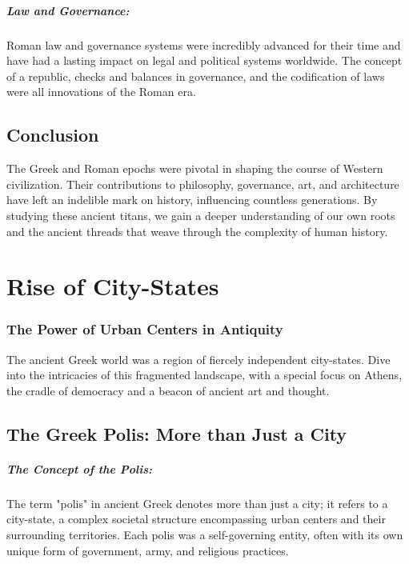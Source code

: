 \documentclass[a4paper,12pt]{book}
\begin{document}
\paragraph{Law and Governance:}
Roman law and governance systems were incredibly advanced for their time and have had a lasting impact on legal and political systems worldwide. The concept of a republic, checks and balances in governance, and the codification of laws were all innovations of the Roman era.

\section*{Conclusion}

The Greek and Roman epochs were pivotal in shaping the course of Western civilization. Their contributions to philosophy, governance, art, and architecture have left an indelible mark on history, influencing countless generations. By studying these ancient titans, we gain a deeper understanding of our own roots and the ancient threads that weave through the complexity of human history.

\chapter{Rise of City-States}
\subsection*{The Power of Urban Centers in Antiquity}
The ancient Greek world was a region of fiercely independent city-states. Dive into the intricacies of this fragmented landscape, with a special focus on Athens, the cradle of democracy and a beacon of ancient art and thought.

\section*{The Greek Polis: More than Just a City}

\paragraph{The Concept of the Polis:}
The term "polis" in ancient Greek denotes more than just a city; it refers to a city-state, a complex societal structure encompassing urban centers and their surrounding territories. Each polis was a self-governing entity, often with its own unique form of government, army, and religious practices.
\end{document}
